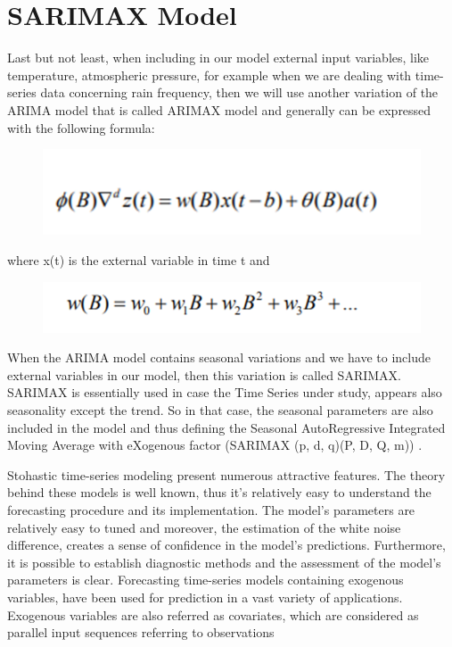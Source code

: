 \section{SARIMAX Model}
Last but not least, when including in our model external input variables, like temperature, atmospheric pressure, for example when we are dealing with time-series data concerning rain frequency, then we will use another variation of the ARIMA model that is called ARIMAX model and generally can be expressed with the following formula:
\begin{figure}[htbp]
\centering
\includegraphics[width=0.6\linewidth]{project/ARIMAX.png}
\label{fig:felix}
\end{figure}
\newline where x(t) is the external variable in time t and
\begin{figure}[htbp]
\centering
\includegraphics[width=0.6\linewidth]{project/w.png}
\label{fig:felix}
\end{figure}
When the ARIMA model contains seasonal variations and we have to include external variables in our model, then this variation is called SARIMAX. SARIMAX is essentially used in case the Time Series under study,  appears also seasonality except the trend. So in that case, the seasonal parameters are also included in the model and thus defining the Seasonal AutoRegressive Integrated Moving Average with eXogenous factor (SARIMAX (p, d, q)(P, D, Q, m)) \cite{tarsitano2017short}. \par Stohastic time-series modeling present numerous attractive features. The theory behind these models is well known, thus it's relatively easy to understand the forecasting procedure and its implementation. The model's parameters are relatively easy to tuned and moreover, the estimation of the white noise difference, creates a sense of confidence in the model's predictions. Furthermore, it is possible to establish diagnostic methods and the assessment of the model's parameters is clear. Forecasting time-series models containing exogenous variables, have been used for prediction in a vast variety of applications. Exogenous variables are also referred as covariates, which are considered as parallel input sequences referring to observations 
